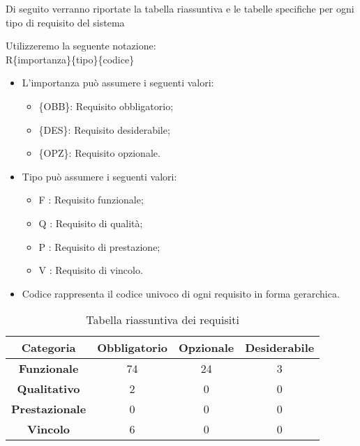 Di seguito verranno riportate la tabella riassuntiva e le tabelle specifiche per ogni tipo di requisito del sistema 

Utilizzeremo la seguente notazione:\\
R\{importanza\}\{tipo\}\{codice\}

\begin{itemize}
	\item L'importanza può assumere i seguenti valori:
	\begin{itemize}
		\item \{OBB\}: Requisito obbligatorio;
		\item \{DES\}: Requisito desiderabile;
		\item \{OPZ\}: Requisito opzionale.
	\end{itemize}
	
	\item Tipo può assumere i seguenti valori:
	\begin{itemize}
		\item {F} : Requisito funzionale;
		\item {Q} : Requisito di qualità;
		\item {P} : Requisito di prestazione;
		\item {V} : Requisito di vincolo.
	\end{itemize}
	
	\item Codice rappresenta il codice univoco di ogni requisito in forma gerarchica.
\end{itemize}

	\begin{table}[h]
		\centering
		\begin{tabular}{|c|c|c|c|}
			\toprule
			
			\textbf{Categoria} & \textbf{Obbligatorio} & \textbf{Opzionale} & \textbf{Desiderabile} \\
			
			\midrule
			\textbf{Funzionale} & 74 & 24 & 3 \\ \midrule
			\textbf{Qualitativo} & 2 & 0 & 0 \\  \midrule
			\textbf{Prestazionale} & 0 & 0 & 0 \\ \midrule
			\textbf{Vincolo} & 6 & 0 & 0  \\ \midrule
			
			\bottomrule
			
		\end{tabular}
		\caption{Tabella riassuntiva dei requisiti}
		
	\end{table}
	\newpage


\newpage


\newpage


\newpage


\newpage

%
